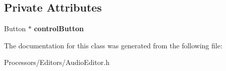 \subsection*{Private Attributes}
\begin{DoxyCompactItemize}
\item 
\hypertarget{classAudioConfigurationWindow_a87e8cfa72ab2e33273d40971b98793dd}{Button $\ast$ {\bfseries control\-Button}}\label{classAudioConfigurationWindow_a87e8cfa72ab2e33273d40971b98793dd}

\end{DoxyCompactItemize}


The documentation for this class was generated from the following file\-:\begin{DoxyCompactItemize}
\item 
Processors/\-Editors/Audio\-Editor.\-h\end{DoxyCompactItemize}
